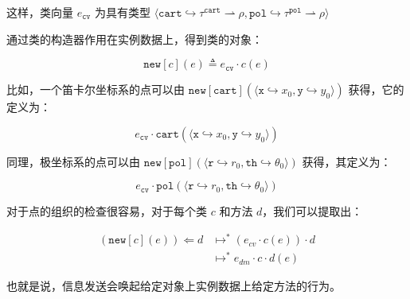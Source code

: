这样，类向量 $e_{\mathtt{cv}}$ 为具有类型 $ \langle {\mathtt{cart}} \hookrightarrow \tau^{\mathtt{cart}} \rightharpoonup \rho, {\mathtt{pol}} \hookrightarrow \tau^{\mathtt{pol}} \rightharpoonup \rho \rangle$

通过类的构造器作用在实例数据上，得到类的对象：

$$ {\mathtt{new}}[c](e) \triangleq e_{\mathtt{cv}} \cdot c(e) $$

比如，一个笛卡尔坐标系的点可以由 $ {\mathtt{new}}[{\mathtt{cart}}](\langle {\mathtt{x}} \hookrightarrow x_{0}, {\mathtt{y}} \hookrightarrow y_{0} \rangle) $ 获得，它的定义为：

$$ e_{\mathtt{cv}} \cdot {\mathtt{cart}}(\langle {\mathtt{x}} \hookrightarrow x_{0}, {\mathtt{y}} \hookrightarrow y_{0}\rangle) $$

同理，极坐标系的点可以由 ${\mathtt{new}}[{\mathtt{pol}}](\langle {\mathtt{r}} \hookrightarrow r_{0}, {\mathtt{th}} \hookrightarrow \theta_{0} \rangle) $ 获得，其定义为：

$$ e_{\mathtt{cv}} \cdot {\mathtt{pol}}(\langle {\mathtt{r}} \hookrightarrow r_{0}, {\mathtt{th}} \hookrightarrow \theta_{0}\rangle) $$

对于点的组织的检查很容易，对于每个类 $c$ 和方法 $d$，我们可以提取出：

\begin{equation}
\begin{aligned}
 ({\mathtt{new}[c](e)}) \Leftarrow d & \longmapsto^{*} (e_{cv} \cdot c(e)) \cdot d \\ 
 & \longmapsto^{*} e_{dm} \cdot c \cdot d(e)
 \nonumber
 \end{aligned}
 \end{equation}

也就是说，信息发送会唤起给定对象上实例数据上给定方法的行为。
